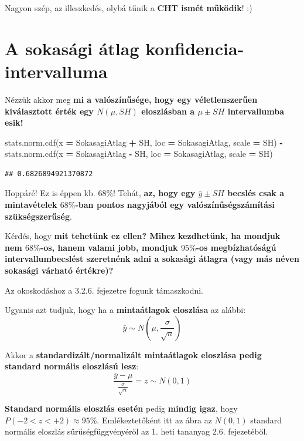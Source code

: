 \documentclass[
]{book}
\newenvironment{Shaded}{\begin{snugshade}}{\end{snugshade}}
\newcommand{\NormalTok}[1]{#1}
\newcommand{\OperatorTok}[1]{\textcolor[rgb]{0.81,0.36,0.00}{\textbf{#1}}}
\begin{document}
Nagyon szép, az illeszkedés, olybá tűnik a \textbf{CHT ismét működik}! :)

\section{A sokasági átlag konfidencia-intervalluma}\label{a-sokasuxe1gi-uxe1tlag-konfidencia-intervalluma}

Nézzük akkor meg \textbf{mi a valószínűsége, hogy egy véletlenszerűen kiválasztott érték egy \(N(\mu, SH)\) eloszlásban a \(\mu \pm SH\) intervallumba esik!}

\begin{Shaded}
\begin{Highlighting}[]
\NormalTok{stats.norm.cdf(x }\OperatorTok{=}\NormalTok{ SokasagiAtlag }\OperatorTok{+}\NormalTok{ SH, loc }\OperatorTok{=}\NormalTok{ SokasagiAtlag, scale }\OperatorTok{=}\NormalTok{ SH) }\OperatorTok{{-}}\NormalTok{ stats.norm.cdf(x }\OperatorTok{=}\NormalTok{ SokasagiAtlag }\OperatorTok{{-}}\NormalTok{ SH, loc }\OperatorTok{=}\NormalTok{ SokasagiAtlag, scale }\OperatorTok{=}\NormalTok{ SH)}
\end{Highlighting}
\end{Shaded}

\begin{verbatim}
## 0.6826894921370872
\end{verbatim}

Hoppáré! Ez is éppen kb. \(68\%\)! Tehát, \textbf{az, hogy egy \(\bar{y} \pm SH\) becslés csak a mintavételek \(68\%\)-ban pontos nagyjából egy valószínűségszámítási szükségszerűség}.

Kérdés, hogy \textbf{mit tehetünk ez ellen? Mihez kezdhetünk, ha mondjuk nem \(68\%\)-os, hanem valami jobb, mondjuk \(95\%\)-os megbízhatóságú intervallumbecslést szeretnénk adni a sokasági átlagra (vagy más néven sokasági várható értékre)?}

Az okoskodáshoz a 3.2.6. fejezetre fogunk támaszkodni.

Ugyanis azt tudjuk, hogy ha a \textbf{mintaátlagok eloszlása} az alábbi: \[\bar{y} \sim N\left(\mu,\frac{\sigma}{\sqrt{n}}\right)\]

Akkor a \textbf{standardizált/normalizált mintaátlagok eloszlása pedig standard normális eloszlású lesz}: \[\frac{\bar{y}-\mu}{\frac{\sigma}{\sqrt{n}}} = z \sim N(0,1)\]

\textbf{Standard normális eloszlás esetén} pedig \textbf{mindig igaz}, hogy \(P(-2<z<+2) \approx 95\%\). Emlékeztetőként itt az ábra az \(N(0,1)\) standard normális eloszlás sűrűségfüggvényéről az 1. heti tananyag 2.6. fejezetéből.
\end{document}
